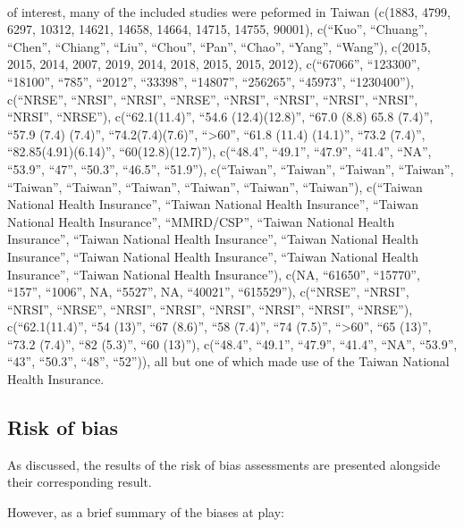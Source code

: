 \documentclass[a4paper, twoside]{templates/ociamthesis}
\begin{document}
~

of interest, many of the included studies were peformed in Taiwan (c(1883, 4799, 6297, 10312, 14621, 14658, 14664, 14715, 14755, 90001), c(``Kuo'', ``Chuang'', ``Chen'', ``Chiang'', ``Liu'', ``Chou'', ``Pan'', ``Chao'', ``Yang'', ``Wang''), c(2015, 2015, 2014, 2007, 2019, 2014, 2018, 2015, 2015, 2012), c(``67066'', ``123300'', ``18100'', ``785'', ``2012'', ``33398'', ``14807'', ``256265'', ``45973'', ``1230400''), c(``NRSE'', ``NRSI'', ``NRSI'', ``NRSE'', ``NRSI'', ``NRSI'', ``NRSI'', ``NRSI'', ``NRSI'', ``NRSE''), c(``62.1(11.4)'', ``54.6 (12.4)(12.8)'', ``67.0 (8.8) \textbar{} 65.8 (7.4)'', ``57.9 (7.4) (7.4)'', ``74.2(7.4)(7.6)'', ``\textgreater60'', ``61.8 (11.4) (14.1)'', ``73.2 (7.4)'', ``82.85(4.91)(6.14)'', ``60(12.8)(12.7)''), c(``48.4'', ``49.1'', ``47.9'', ``41.4'', ``NA'', ``53.9'', ``47'', ``50.3'', ``46.5'', ``51.9''), c(``Taiwan'', ``Taiwan'', ``Taiwan'', ``Taiwan'', ``Taiwan'', ``Taiwan'', ``Taiwan'', ``Taiwan'', ``Taiwan'', ``Taiwan''), c(``Taiwan National Health Insurance'', ``Taiwan National Health Insurance'', ``Taiwan National Health Insurance'', ``MMRD/CSP'', ``Taiwan National Health Insurance'', ``Taiwan National Health Insurance'', ``Taiwan National Health Insurance'', ``Taiwan National Health Insurance'', ``Taiwan National Health Insurance'', ``Taiwan National Health Insurance''), c(NA, ``61650'', ``15770'', ``157'', ``1006'', NA, ``5527'', NA, ``40021'', ``615529''), c(``NRSE'', ``NRSI'', ``NRSI'', ``NRSE'', ``NRSI'', ``NRSI'', ``NRSI'', ``NRSI'', ``NRSI'', ``NRSE''), c(``62.1(11.4)'', ``54 (13)'', ``67 (8.6)'', ``58 (7.4)'', ``74 (7.5)'', ``\textgreater60'', ``65 (13)'', ``73.2 (7.4)'', ``82 (5.3)'', ``60 (13)''), c(``48.4'', ``49.1'', ``47.9'', ``41.4'', ``NA'', ``53.9'', ``43'', ``50.3'', ``48'', ``52'')), all but one of which made use of the Taiwan National Health Insurance.

\hypertarget{risk-of-bias-res}{%
\subsection{Risk of bias}\label{risk-of-bias-res}}

As discussed, the results of the risk of bias assessments are presented alongside their corresponding result.

However, as a brief summary of the biases at play:
\end{document}
